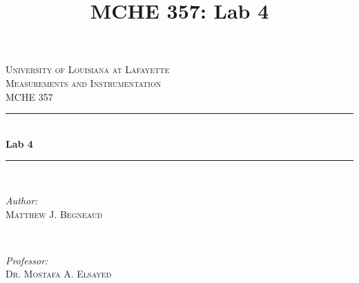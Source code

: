 \documentclass[12pt]{article}
\title{MCHE 357: Lab 4}
\begin{document}




\begin{titlepage}

\newcommand{\HRule}{\rule{\linewidth}{0.5mm}} %

\center %
 

\textsc{\LARGE University of Louisiana at Lafayette}\\[1.5cm] %
\textsc{\Large Measurements and Instrumentation}\\[0.5cm] %
\textsc{\large MCHE 357}\\[0.5cm] %


\HRule \\[0.4cm]
{ \huge \bfseries Lab 4}\\[0.4cm] %
\HRule \\[1.5cm]
 

\begin{minipage}{0.4\textwidth}
\begin{flushleft} \large
\emph{Author:}\\
\textsc{Matthew J. Begneaud} \\%
\end{flushleft}
\end{minipage}
~
\begin{minipage}{0.4\textwidth}
\begin{flushright} \large
\emph{Professor:} \\
\textsc{Dr. Mostafa A. Elsayed} %
\end{flushright}
\end{minipage}\\[1.5cm]


\end{titlepage}
\end{document}
